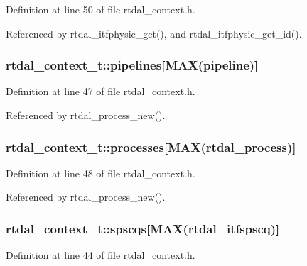 Definition at line 50 of file rtdal\-\_\-context.\-h.



Referenced by rtdal\-\_\-itfphysic\-\_\-get(), and rtdal\-\_\-itfphysic\-\_\-get\-\_\-id().

\subsubsection[{pipelines}]{ rtdal\-\_\-context\-\_\-t\-::pipelines[{\bf M\-A\-X}(pipeline)]}\label{structrtdal__context__t_a772193d8fa3cedd8888abc472dfe38de}


Definition at line 47 of file rtdal\-\_\-context.\-h.



Referenced by rtdal\-\_\-process\-\_\-new().

\subsubsection[{processes}]{ rtdal\-\_\-context\-\_\-t\-::processes[{\bf M\-A\-X}(rtdal\-\_\-process)]}\label{structrtdal__context__t_a6b152d6315f1adb5fb53cd7005923ed8}


Definition at line 48 of file rtdal\-\_\-context.\-h.



Referenced by rtdal\-\_\-process\-\_\-new().

\subsubsection[{spscqs}]{ rtdal\-\_\-context\-\_\-t\-::spscqs[{\bf M\-A\-X}(rtdal\-\_\-itfspscq)]}\label{structrtdal__context__t_a089a2c82209dab33ed6b053fd455ddc6}


Definition at line 44 of file rtdal\-\_\-context.\-h.



